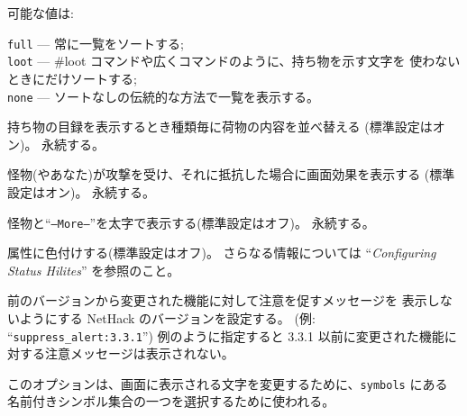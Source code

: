 可能な値は:

{\tt full} --- 常に一覧をソートする;\\
{\tt loot} --- \#loot コマンドや広くコマンドのように、持ち物を示す文字を
使わないときにだけソートする;\\
{\tt none} --- ソートなしの伝統的な方法で一覧を表示する。
\item[\ib{sortpack}]
持ち物の目録を表示するとき種類毎に荷物の内容を並べ替える
(標準設定はオン)。
永続する。
\item[\ib{sparkle}]
怪物(やあなた)が攻撃を受け、それに抵抗した場合に画面効果を表示する
(標準設定はオン)。
永続する。
\item[\ib{standout}]
怪物と``{\tt --More--}''を太字で表示する(標準設定はオフ)。
永続する。
\item[\ib{statushilites}]
属性に色付けする(標準設定はオフ)。
さらなる情報については ``{\it Configuring Status Hilites\/}'' を参照のこと。
\item[\ib{suppress\verb+_+alert}]
前のバージョンから変更された機能に対して注意を促すメッセージを
表示しないようにする NetHack のバージョンを設定する。
(例: ``{\tt suppress\verb+_+alert:3.3.1}'')
例のように指定すると 3.3.1 以前に変更された機能に対する注意メッセージは表示されない。
\item[\ib{symset}]
このオプションは、画面に表示される文字を変更するために、{\tt symbols} にある
名前付きシンボル集合の一つを選択するために使われる。
\item[\ib{time}]
